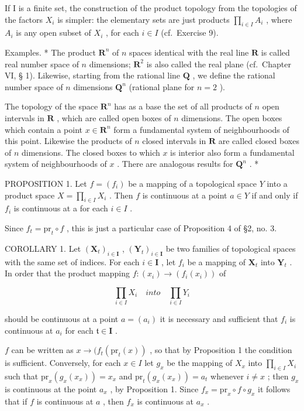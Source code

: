 If I is a finite set, the construction of the product topology from the topologies of the factors \(X_{i}\) is simpler: the elementary sets are just products \(\prod_{i\in I}A_{i}\) , where \(A_{i}\) is any open subset of \(X_{i}\) , for each \(i\in I\) (cf.~Exercise 9).

Examples. * The product \(\mathbf{R}^n\) of \(n\) spaces identical with the real line \(\mathbf{R}\) is called real number space of \(n\) dimensions; \(\mathbf{R}^2\) is also called the real plane (cf.~Chapter VI, § 1). Likewise, starting from the rational line \(\mathbf{Q}\) , we define the rational number space of \(n\) dimensions \(\mathbf{Q}^n\) (rational plane for \(n = 2\) ).

The topology of the space \(\mathbf{R}^n\) has as a base the set of all products of \(n\) open intervals in \(\mathbf{R}\) , which are called open boxes of \(n\) dimensions. The open boxes which contain a point \(x \in \mathbf{R}^n\) form a fundamental system of neighbourhoods of this point. Likewise the products of \(n\) closed intervals in \(\mathbf{R}\) are called closed boxes of \(n\) dimensions. The closed boxes to which \(x\) is interior also form a fundamental system of neighbourhoods of \(x\) . There are analogous results for \(\mathbf{Q}^n\) . *

PROPOSITION 1. Let \(f = (f_{i})\) be a mapping of a topological space \(Y\) into a product space \(X = \prod_{i \in I} X_{i}\) . Then \(f\) is continuous at a point \(a \in Y\) if and only if \(f_{i}\) is continuous at a for each \(i \in I\) .

Since \(f_{t} = \mathrm{pr}_{t} \circ f\) , this is just a particular case of Proposition 4 of §2, no. 3.

COROLLARY 1. Let \((\mathbf{X}_t)_{i \in \mathbf{I}}\) , \((\mathbf{Y}_t)_{i \in \mathbf{I}}\) be two families of topological spaces with the same set of indices. For each \(i \in \mathbf{I}\) , let \(f_i\) be a mapping of \(\mathbf{X}_t\) into \(\mathbf{Y}_t\) . In order that the product mapping \(f: (x_i) \to (f_i(x_i))\) of

\[
\prod_ {i \in I} X _ {i} \quad i n t o \quad \prod_ {i \in I} Y _ {i}
\]

should be continuous at a point \(a = (a_{i})\) it is necessary and sufficient that \(f_{i}\) is continuous at \(a_{i}\) for each \(\mathfrak{t} \in \mathbf{I}\) .

\(f\) can be written as \(x \to (f_{t}(\mathrm{pr}_{t}(x))\) , so that by Proposition 1 the condition is sufficient. Conversely, for each \(x \in I\) let \(g_{x}\) be the mapping of \(X_{x}\) into \(\prod_{i \in I} X_{i}\) such that \(\mathrm{pr}_{x}(g_{x}(x_{x})) = x_{x}\) and \(\mathrm{pr}_{t}(g_{x}(x_{x})) = a_{t}\) whenever \(i \neq x\) ; then \(g_{x}\) is continuous at the point \(a_{x}\) , by Proposition 1. Since \(f_{x} = \mathrm{pr}_{x} \circ f \circ g_{x}\) it follows that if \(f\) is continuous at \(a\) , then \(f_{x}\) is continuous at \(a_{x}\) .

